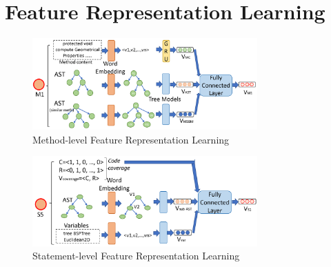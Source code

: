 \section{Feature Representation Learning}
\label{feature-learning:sec}

\begin{figure}[t]
	\centering
	\includegraphics[width=3.4in]{graphs/step-2-method.png}
	\caption{Method-level Feature Representation Learning}
	\label{method-level-feature-learning}
\end{figure}


\begin{figure}[t]
	\centering
	\includegraphics[width=3.4in]{graphs/step-2-statement.png}
	\caption{Statement-level Feature Representation Learning}
	\label{statement-level-feature-learning}
\end{figure}
